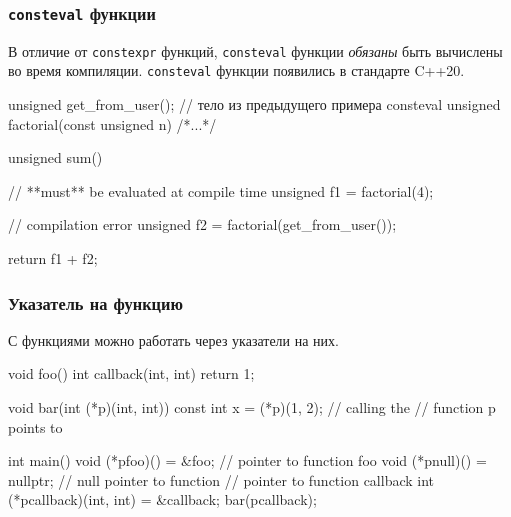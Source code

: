 \documentclass[compress, 8pt, aspectratio=169]{beamer}
\begin{document}
\begin{frame}[fragile]

    \frametitle{\texttt{consteval} функции}

    В отличие от \verb|constexpr| функций, \verb|consteval| функции\footnotemark{}
    \textit{обязаны} быть вычислены во время компиляции.
    \verb|consteval| функции появились в стандарте C++20.


    \begin{myinplacelisting}[minted language=cpp]
unsigned get_from_user();
// тело из предыдущего примера
consteval unsigned factorial(const unsigned n) {/*...*/}

unsigned sum() {
    // **must** be evaluated at compile time
    unsigned f1 = factorial(4);

    // compilation error
    unsigned f2 = factorial(get_from_user());

    return f1 + f2;
}
    \end{myinplacelisting}

\end{frame}

\begin{frame}[fragile]

    \frametitle{Указатель на функцию}

    С функциями можно работать через указатели на них.

    \begin{myinplacelisting}[minted language=cpp]
void foo() {}
int callback(int, int) { return 1; }

void bar(int (*p)(int, int)) {
    const int x = (*p)(1, 2); // calling the
                              // function p points to
}

int main() {
    void (*pfoo)() = &foo; // pointer to function foo
    void (*pnull)() = nullptr; // null pointer to function
    // pointer to function callback
    int (*pcallback)(int, int) = &callback;
    bar(pcallback);
}
    \end{myinplacelisting}

\end{frame}
\end{document}
